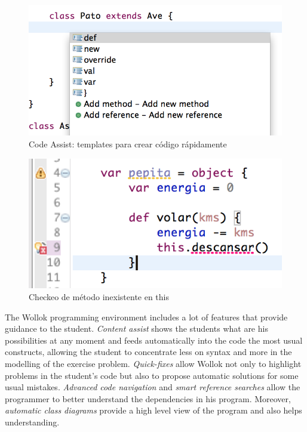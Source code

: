 	\begin{figure}[p]
	    \centering
		\includegraphics[scale=0.5]{images/wollok-paper-codetemplates.png}
	    \caption{Code Assist: templates para crear código rápidamente}
	    \label{fig:codetemplates.png}
	\end{figure}

	\begin{figure}[p]
	    \centering
		\includegraphics[scale=0.5]{images/wollok-paper-check-noMethodOnThis.png}
	    \caption{Checkeo de método inexistente en this}
	    \label{fig:check-noMethodOnThis.png}
	\end{figure}


The Wollok programming environment includes a lot of features that provide guidance to the student.
\emph{Content assist} shows the students what are his possibilities at any moment and feeds automatically into the code the most usual constructs, 
allowing the student to concentrate less on syntax and more in the modelling of the exercise problem.
\emph{Quick-fixes} allow Wollok not only to highlight problems in the student's code but also to propose automatic solutions for some usual mistakes.
\emph{Advanced code navigation} and \emph{smart reference searches} allow the programmer to better understand the dependencies in his program.
Moreover, \emph{automatic class diagrams} provide a high level view of the program and also helps understanding.

